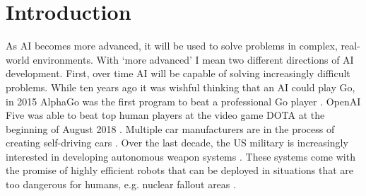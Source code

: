 \section{Introduction}
\label{sec:1}



As AI becomes more advanced, it will be used to solve problems in complex, real-world environments. With `more advanced' I mean two different directions of AI development. First, over time AI will be capable of solving increasingly difficult problems. While ten years ago it was wishful thinking that an AI could play Go, in 2015 AlphaGo was the first program to beat a professional Go player \citep{silver2016go}. OpenAI Five was able to beat top human players at the video game DOTA at the beginning of August 2018 \citep{openai2018results}. Multiple car manufacturers are in the process of creating self-driving cars \citep{tesla2016car}. Over the last decade, the US military is increasingly interested in developing autonomous weapon systems \citep{USDoD2012autonomy}. These systems come with the promise of highly efficient robots that can be deployed in situations that are too dangerous for humans, e.g. nuclear fallout areas \citep{USDoD2012roadmap}. 


